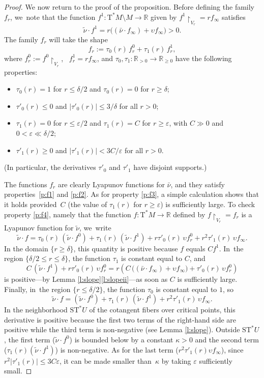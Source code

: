\documentclass[JEP,XML,SOM,Unicode]{cedram}
\newcommand{\R}{{\mathbb R}}
\newcommand{\sT}{\mathrm{T}^\ast}
\newcommand{\sST}{\mathrm{ST}^\ast}
\newcommand{\hnu}{\tilde\nu}
\newcommand{\cnu}{\bar\nu}
\newcommand{\de}{\mathrel{:=}}
\newcommand{\rst}[1]{{\upharpoonright}_{\!#1}}
\let\on\colon
\let\ups\upsilon
\let\eps\varepsilon
\theoremstyle{plain}
\theoremstyle{definition}
\begin{document}
\begin{proof}
We now return to the proof of the proposition. Before defining the family $f_r$, we~note that the function $f^1 \on \sT M \setminus M \to \R$ given by $f^1 \rst{ V_r }
= rf_\infty$ satisfies
\[
\hnu \cdot f^1 =
	r \bigl((\cnu \cdot f_\infty) + \ups f_\infty\bigr) > 0.
\]
The family $f_r$ will take the shape
\[
f_r \de \tau_0(r)\, f_r^0 + \tau_1(r)\, f_r^1,
\]
where $f_r^0 \de f^0 \rst{ V_r }$, \ $f_r^1 = rf_\infty$, and $\tau_0, \tau_1
\on \R_{>0} \to \R_{\ge0}$ have the following properties:
\begin{itemize}
\item
$\tau_0(r) = 1$ for $r \le \delta/2$ and $\tau_0(r) = 0$ for $r \ge \delta$;
\item
$\tau'_0(r) \le 0$ and $|\tau'_0(r)| \le 3/\delta$ for all $r>0$;
\item
$\tau_1(r) = 0$ for $r \le \eps/2$ and $\tau_1(r) = C$ for $r \ge \eps$, with
$C \gg 0$ and $0 < \eps \ll \delta/2$;
\item
$\tau'_1(r) \ge 0$ and $|\tau'_1(r)| < 3C / \eps$ for all $r>0$.
\end{itemize}
(In particular, the derivatives $\tau'_0$ and $\tau'_1$ have disjoint supports.)

The functions $f_r$ are clearly Lyapunov functions for $\cnu$, and they satisfy
properties~\eqref{p:f1} and \eqref{p:f2}. As for property \eqref{p:f3}, a simple calculation shows that it
holds provided~$C$ (the value of $\tau_1(r)$ for $r \ge \eps$) is sufficiently
large. To check property \eqref{p:f4}, namely that the function $f \on \sT M \to \R$ defined by $f \rst{ V_r } = f_r$ is a Lyapunov function for $\hnu$, we~write
\[
\hnu \cdot f =
	\tau_0(r)\, (\hnu \cdot f^0) + \tau_1(r)\, (\hnu \cdot f^1)
	+ r \tau'_0(r)\, \ups f_r^0 + r^2 \tau'_1(r)\, \ups f_\infty.
\]
In the domain $\{r \ge \delta\}$, this quantity is positive because $f$ equals
$C f^1$. In~the region $\{\delta/2 \le r \le \delta\}$, the function $\tau_1$ is
constant equal to $C$, and
\[
C\, (\hnu \cdot f^1) + r \tau'_0(r)\, \ups f_r^0
	= r \left(C\, \bigl((\cnu \cdot f_\infty) + \ups f_\infty\bigr)
	+ \tau'_0(r)\, \ups f_r^0\right)
\]
is positive---by Lemma \ref{l:slope}\eqref{l:slopeii}---as soon as $C$ is sufficiently
large. Finally, in~the region $\{r \le \delta/2\}$, the function $\tau_0$ is
constant equal to $1$, so
\[
\hnu \cdot f = (\hnu \cdot f^0)
	+ \tau_1(r)\, (\hnu \cdot f^1) + r^2 \tau'_1(r)\, \ups f_\infty.
\]
In the neighborhood $\sST U$ of the cotangent fibers over critical points, this
derivative is positive because the first two terms of the right-hand side are
positive while the third term is non-negative (see Lemma \ref{l:slope}). Outside
$\sST U$, the first term ($\hnu \cdot f^0$) is bounded below by a constant
$\kappa>0$ and the second term ($\tau_1(r) (\hnu \cdot f^1)$) is non-negative.
As for the last term ($r^2\tau'_1(r) \ups f_\infty$), since $r^2 |\tau'_1(r)|
\le 3C\eps$, it can be made smaller than~$\kappa$ by taking $\eps$ sufficiently
small.


\end{proof}
\end{document}
